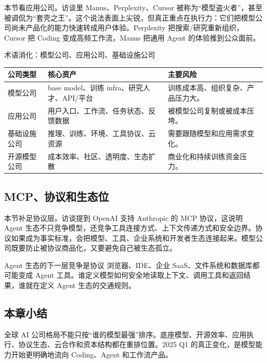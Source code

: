 \documentclass[a4paper]{article}
\begin{document}
本节看应用公司。访谈里 Manus、Perplexity、Cursor 被称为“模型盗火者”，甚至被调侃为“套壳之王”。这个说法表面上尖锐，但真正重点在执行力：它们把模型公司尚未产品化的能力快速转成用户体验。Perplexity 把搜索/研究重新组织，Cursor 把 Coding 变成高频工作流，Manus 把通用 Agent 的体验推到公众面前。

\begin{knowledgebox}{术语消化：模型公司、应用公司、基础设施公司}
\noindent\begin{tabularx}{\textwidth}{p{}p{}X}
\toprule
公司类型 & 核心资产 & 主要风险 \\
\midrule
模型公司 & base model、训练 infra、研究人才、API/平台 & 训练成本高、组织复杂、产品压力大。 \\
应用公司 & 用户入口、工作流、任务状态、反馈数据 & 被模型公司复制或被成本压垮。 \\
基础设施公司 & 推理、训练、环境、工具协议、云资源 & 需要跟随模型和应用需求变化。 \\
开源模型公司 & 成本效率、社区、透明度、生态扩散 & 商业化和持续训练资金压力。 \\
\bottomrule
\end{tabularx}
\end{knowledgebox}

\subsection{MCP、协议和生态位}

本节补足协议层。访谈提到 OpenAI 支持 Anthropic 的 MCP 协议，这说明 Agent 生态不只竞争模型，还竞争工具连接方式、上下文传递方式和安全边界。协议如果成为事实标准，会把模型、工具、企业系统和开发者生态连接起来。模型公司既要防止被协议商品化，又要避免自己被生态孤立。

\begin{importantbox}{Agent 生态的下一层竞争是协议}
浏览器、IDE、企业 SaaS、文件系统和数据库都可能变成 Agent 工具。谁定义模型如何安全地读取上下文、调用工具和返回结果，谁就在定义 Agent 生态的交通规则。
\end{importantbox}

\subsection{本章小结}

全球 AI 公司格局不能只按“谁的模型最强”排序。底座模型、开源效率、应用执行、协议生态、云合作和资本结构都在重排位置。2025 Q1 的真正变化，是模型能力开始更明确地流向 Coding、Agent 和工作流产品。
\end{document}
